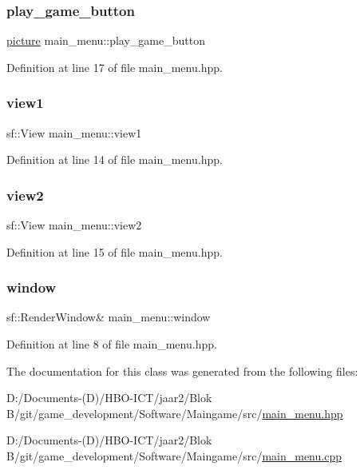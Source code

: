 \subsubsection{\texorpdfstring{play\+\_\+game\+\_\+button}{play\_game\_button}}
{\footnotesize\ttfamily \hyperlink{classpicture}{picture} main\+\_\+menu\+::play\+\_\+game\+\_\+button}



Definition at line 17 of file main\+\_\+menu.\+hpp.

\mbox{\label{classmain__menu_a673d7133b0bbaf357bd1578830545352}} 
\subsubsection{\texorpdfstring{view1}{view1}}
{\footnotesize\ttfamily sf\+::\+View main\+\_\+menu\+::view1}



Definition at line 14 of file main\+\_\+menu.\+hpp.

\mbox{\label{classmain__menu_aa3d65353a385ba3e32800335cafef315}} 
\subsubsection{\texorpdfstring{view2}{view2}}
{\footnotesize\ttfamily sf\+::\+View main\+\_\+menu\+::view2}



Definition at line 15 of file main\+\_\+menu.\+hpp.

\mbox{\label{classmain__menu_aa3c11885ae695ba18f0b1c48cd4012c5}} 
\subsubsection{\texorpdfstring{window}{window}}
{\footnotesize\ttfamily sf\+::\+Render\+Window\& main\+\_\+menu\+::window\hspace{0.3cm}{\ttfamily [private]}}



Definition at line 8 of file main\+\_\+menu.\+hpp.



The documentation for this class was generated from the following files\+:\begin{DoxyCompactItemize}
\item 
D\+:/\+Documents-\/(\+D)/\+H\+B\+O-\/\+I\+C\+T/jaar2/\+Blok B/git/game\+\_\+development/\+Software/\+Maingame/src/\hyperlink{main__menu_8hpp}{main\+\_\+menu.\+hpp}\item 
D\+:/\+Documents-\/(\+D)/\+H\+B\+O-\/\+I\+C\+T/jaar2/\+Blok B/git/game\+\_\+development/\+Software/\+Maingame/src/\hyperlink{main__menu_8cpp}{main\+\_\+menu.\+cpp}\end{DoxyCompactItemize}
